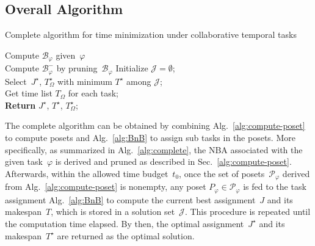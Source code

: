 \subsection{Overall Algorithm}\label{subsubsec:overall-algorithm}

\begin{algorithm}[t]
	\caption{Complete algorithm for time minimization
        under collaborative temporal tasks}
	\label{alg:complete}
	Compute $\mathcal{B}_{\varphi}$ given~$\varphi$ \\
	Compute $\mathcal{B}^{-}_{\varphi}$ by pruning~$\mathcal{B}_{\varphi}$
        Initialize $\mathcal{J}=\emptyset$;\\
        Select~$J^\star$, $T^\star_\Omega$ with minimum $T^\star$ among $\mathcal{J}$;\\
        Get time list $T_\Omega$ for each task;\\
	\textbf{Return} $J^\star$, $T^\star$, $T^\star_\Omega$;
\end{algorithm}

The complete algorithm can be obtained by combining
Alg.~\ref{alg:compute-poset} to compute posets
and Alg.~\ref{alg:BnB} to assign sub tasks in the posets.
More specifically, as summarized in Alg.~\ref{alg:complete},
the NBA associated with the given task~$\varphi$ is derived and pruned as
described in Sec.~\ref{alg:compute-poset}.
Afterwards, within the allowed time budget~$t_0$,
once the set of posets~$\mathcal{P}_{\varphi}$ derived from
Alg.~\ref{alg:compute-poset}
is nonempty, any poset $P_\varphi\in \mathcal{P}_{\varphi}$ is fed to
the task assignment Alg.~\ref{alg:BnB} to compute the current best
assignment~$J$ and its makespan~$T$, which is stored in
a solution set~$\mathcal{J}$.
This procedure is repeated until the computation time elapsed.
By then, the optimal assignment~$J^\star$ and its makespan~$T^\star$
are returned as the optimal solution.

